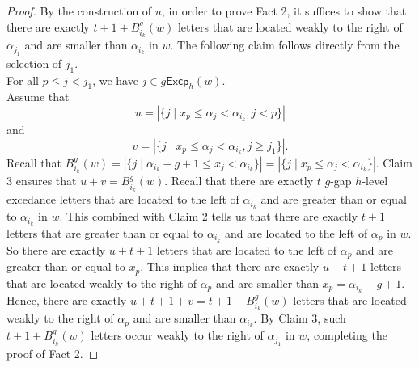 \documentclass[10pt,a4paper]{amsart}
\def\Excp{\mathsf{Excp}}
\begin{document}
\begin{proof}
   By the construction of $u$, in order to prove  Fact 2, it suffices to show that there are exactly $t+1+B^g_{i_k}(w)$ letters that are located weakly to the right of  $\alpha_{j_{1}}$ and  are smaller than $\alpha_{i_k}$ in $w$. 
  The following claim follows directly from   the selection of $j_{1}$. \\
   For all $p\leq j<j_{1}$, we have $j\in g\Excp_{h}(w)$. \\
   Assume that 
   $$
   u=|\{j\mid x_p\leq \alpha_{j}<\alpha_{i_k}, j<p\} |  
   $$
   and 
   $$
   v=|\{j\mid x_p\leq \alpha_{j}<\alpha_{i_k}, j\geq j_{1}\} | .
   $$
   Recall that $B^g_{i_k}(w)=|\{j\mid \alpha_{i_k}-g+1\leq x_{j}<\alpha_{i_k} \}|=|\{j\mid x_p\leq \alpha_{j}<\alpha_{i_k} \}|$.
   Claim  3 ensures that $u+v=B^g_{i_k}(w)$.  
   Recall that there are exactly $t$ $g$-gap $h$-level excedance letters that are located to the left of $\alpha_{i_k}$ and   are greater than or equal to $\alpha_{i_k}$ in $w$.  This   combined with Claim 2 tells us that  there are exactly $t+1$ letters that are greater than or equal to $\alpha_{i_k}$ and   are located to the left of $\alpha_{p}$ in $w$.    So there are exactly $u+t+1$ letters that are located to the left of $\alpha_p$ and  are greater than or equal to $x_p$. This implies that there are exactly $u+t+1$ letters that are located weakly to the right of  $\alpha_{p}$ and  are smaller than $x_p=\alpha_{i_k}-g+1$. Hence, there are exactly $u+t+1+v=t+1+B^g_{i_k}(w)$ letters that are located weakly to the right of  $\alpha_{p}$ and  are smaller than $\alpha_{i_k}$. 
    By Claim 3, such $t+1+B^g_{i_k}(w)$   letters  occur weakly to the right of $\alpha_{j_{1}}$ in $w$, completing the proof of Fact 2. 
	\end{proof}
\end{document}
